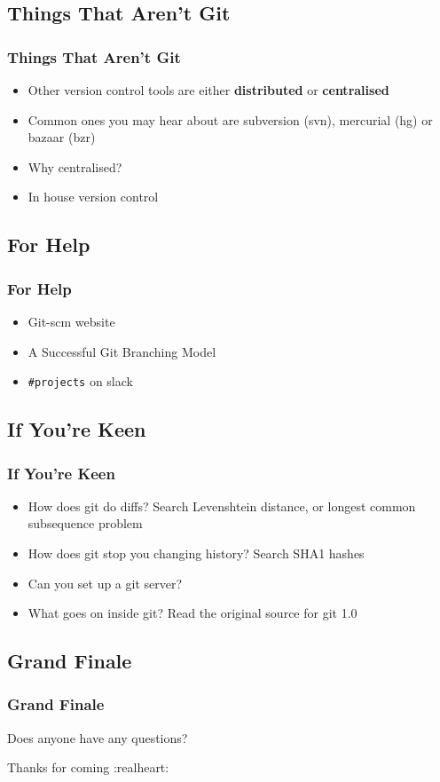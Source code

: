 \documentclass{beamer}
\begin{document}
\subsection{Things That Aren't Git}
\begin{frame}
    \frametitle{Things That Aren't Git}

    \begin{itemize}[<+->]
        \item Other version control tools are either \textbf{distributed} or \textbf{centralised}
        \item Common ones you may hear about are subversion (svn), mercurial (hg) or bazaar (bzr)
        \item Why centralised?
        \item In house version control
    \end{itemize}
\end{frame}

\subsection{For Help}
\begin{frame}
    \frametitle{For Help}

    \begin{itemize}[<+->]
        \item Git-scm website
        \item A Successful Git Branching Model
        \item \texttt{\#projects} on slack
    \end{itemize}
\end{frame}

\subsection{If You're Keen}
\begin{frame}
    \frametitle{If You're Keen}

    \begin{itemize}[<+->]
        \item How does git do diffs? Search Levenshtein distance, or longest common subsequence problem
        \item How does git stop you changing history? Search SHA1 hashes
        \item Can you set up a git server?
        \item What goes on inside git? Read the original source for git 1.0
    \end{itemize}
\end{frame}

\subsection{Grand Finale}
\begin{frame}
    \frametitle{Grand Finale}

    \pause
    Does anyone have any questions?

    \pause

    Thanks for coming :realheart:
\end{frame}
\end{document}
